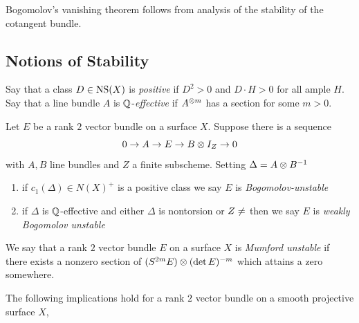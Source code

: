 \documentclass[main.tex]{subfiles}
\begin{document}
Bogomolov's vanishing theorem follows from analysis of the stability of the cotangent bundle.

\subsection{Notions of Stability}

Say that a class $D \in \operatorname{\mathrm{NS}}(X)$ is \textit{positive} if $D^2 > 0$ and $D \cdot H > 0$ for all ample $H$. Say that a line bundle $A$ is $\mathbb{Q}$-\textit{effective} if $A^{\otimes m}$ has a section for some $m > 0$.

\begin{defn}
Let $E$ be a rank $2$ vector bundle on a surface $X$. Suppose there is a sequence
\[ 0 \to A \to E \to B \otimes I_Z \to 0 \]
with $A,B$ line bundles and $Z$ a finite subscheme. Setting $\Delta = A \otimes B^{-1}$
\begin{enumerate}
\item if $c_1(\Delta) \in N(X)^+$ is a positive class we say $E$ is \textit{Bogomolov-unstable}
\item if $\Delta$ is $\mathbb{Q}$-effective and either $\Delta$ is nontorsion or $Z \neq \empty$ then we say $E$ is \textit{weakly Bogomolov unstable}
\end{enumerate}
\end{defn}

\begin{defn}
We say that a rank $2$ vector bundle $E$ on a surface $X$ is \textit{Mumford unstable} if there exists a nonzero section of $(S^{2m} E) \otimes (\det{E})^{-m}$ which attains a zero somewhere.
\end{defn}

\begin{theorem}
The following implications hold for a rank $2$ vector bundle on a smooth projective surface $X$,
\begin{center}
\end{center}
\end{theorem}
\end{document}
